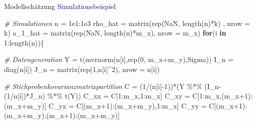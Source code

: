 \documentclass[
  8pt,
  ignorenonframetext,
]{beamer}
\newenvironment{Shaded}{\begin{snugshade}}{\end{snugshade}}
\newcommand{\AttributeTok}[1]{\textcolor[rgb]{0.77,0.63,0.00}{#1}}
\newcommand{\CommentTok}[1]{\textcolor[rgb]{0.56,0.35,0.01}{\textit{#1}}}
\newcommand{\ConstantTok}[1]{\textcolor[rgb]{0.00,0.00,0.00}{#1}}
\newcommand{\ControlFlowTok}[1]{\textcolor[rgb]{0.13,0.29,0.53}{\textbf{#1}}}
\newcommand{\DecValTok}[1]{\textcolor[rgb]{0.00,0.00,0.81}{#1}}
\newcommand{\FloatTok}[1]{\textcolor[rgb]{0.00,0.00,0.81}{#1}}
\newcommand{\FunctionTok}[1]{\textcolor[rgb]{0.00,0.00,0.00}{#1}}
\newcommand{\NormalTok}[1]{#1}
\newcommand{\OtherTok}[1]{\textcolor[rgb]{0.56,0.35,0.01}{#1}}
\newcommand{\SpecialCharTok}[1]{\textcolor[rgb]{0.00,0.00,0.00}{#1}}
\begin{document}
\begin{frame}[fragile]{Modellschätzung}
\protect\hypertarget{modellschuxe4tzung-2}{}
\textcolor{darkblue}{Simulationsbeispiel}

\vspace{2mm}
\tiny
{}

\begin{Shaded}
\begin{Highlighting}[]
\CommentTok{\# Simulationen}
\NormalTok{n       }\OtherTok{=} \FloatTok{1e1}\SpecialCharTok{:}\FloatTok{1e3}
\NormalTok{rho\_hat }\OtherTok{=} \FunctionTok{matrix}\NormalTok{(}\FunctionTok{rep}\NormalTok{(}\ConstantTok{NaN}\NormalTok{, }\FunctionTok{length}\NormalTok{(n)}\SpecialCharTok{*}\NormalTok{k)  , }\AttributeTok{nrow =}\NormalTok{ k)}
\NormalTok{a\_1\_hat }\OtherTok{=} \FunctionTok{matrix}\NormalTok{(}\FunctionTok{rep}\NormalTok{(}\ConstantTok{NaN}\NormalTok{, }\FunctionTok{length}\NormalTok{(n)}\SpecialCharTok{*}\NormalTok{m\_x), }\AttributeTok{nrow =}\NormalTok{ m\_x)}
\ControlFlowTok{for}\NormalTok{(i }\ControlFlowTok{in} \DecValTok{1}\SpecialCharTok{:}\FunctionTok{length}\NormalTok{(n))\{}

    \CommentTok{\# Datengeneration}
\NormalTok{    Y          }\OtherTok{=} \FunctionTok{t}\NormalTok{(}\FunctionTok{mvrnorm}\NormalTok{(n[i],}\FunctionTok{rep}\NormalTok{(}\DecValTok{0}\NormalTok{, m\_x}\SpecialCharTok{+}\NormalTok{m\_y),Sigma))}
\NormalTok{    I\_n        }\OtherTok{=} \FunctionTok{diag}\NormalTok{(n[i])}
\NormalTok{    J\_n        }\OtherTok{=} \FunctionTok{matrix}\NormalTok{(}\FunctionTok{rep}\NormalTok{(}\DecValTok{1}\NormalTok{,n[i]}\SpecialCharTok{\^{}}\DecValTok{2}\NormalTok{), }\AttributeTok{nrow =}\NormalTok{ n[i])}

    \CommentTok{\# Stichprobenkovarianzmatrixpartition}
\NormalTok{    C          }\OtherTok{=}\NormalTok{ (}\DecValTok{1}\SpecialCharTok{/}\NormalTok{(n[i]}\SpecialCharTok{{-}}\DecValTok{1}\NormalTok{))}\SpecialCharTok{*}\NormalTok{(Y }\SpecialCharTok{\%*\%}\NormalTok{ (I\_n}\SpecialCharTok{{-}}\NormalTok{(}\DecValTok{1}\SpecialCharTok{/}\NormalTok{n[i])}\SpecialCharTok{*}\NormalTok{J\_n) }\SpecialCharTok{\%*\%} \FunctionTok{t}\NormalTok{(Y))}
\NormalTok{    C\_xx       }\OtherTok{=}\NormalTok{ C[}\DecValTok{1}\SpecialCharTok{:}\NormalTok{m\_x,}\DecValTok{1}\SpecialCharTok{:}\NormalTok{m\_x]}
\NormalTok{    C\_xy       }\OtherTok{=}\NormalTok{ C[}\DecValTok{1}\SpecialCharTok{:}\NormalTok{m\_x,(m\_x}\SpecialCharTok{+}\DecValTok{1}\NormalTok{)}\SpecialCharTok{:}\NormalTok{(m\_x}\SpecialCharTok{+}\NormalTok{m\_y)]}
\NormalTok{    C\_yx       }\OtherTok{=}\NormalTok{ C[(m\_x}\SpecialCharTok{+}\DecValTok{1}\NormalTok{)}\SpecialCharTok{:}\NormalTok{(m\_x}\SpecialCharTok{+}\NormalTok{m\_y),}\DecValTok{1}\SpecialCharTok{:}\NormalTok{m\_x]}
\NormalTok{    C\_yy       }\OtherTok{=}\NormalTok{ C[(m\_x}\SpecialCharTok{+}\DecValTok{1}\NormalTok{)}\SpecialCharTok{:}\NormalTok{(m\_x}\SpecialCharTok{+}\NormalTok{m\_y),(m\_x}\SpecialCharTok{+}\DecValTok{1}\NormalTok{)}\SpecialCharTok{:}\NormalTok{(m\_x}\SpecialCharTok{+}\NormalTok{m\_y)]}


\end{Highlighting}
\end{Shaded}
\end{frame}
\end{document}
